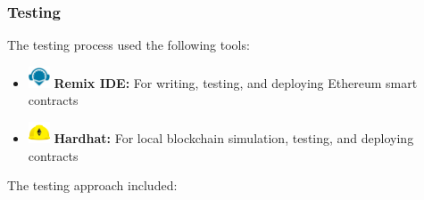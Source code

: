 \subsubsection{Testing}

The testing process used the following tools:

\begin{itemize}
    \item \includegraphics[width=0.05\textwidth]{images/icons/remix.png} \textbf{Remix IDE:} For writing, testing, and deploying Ethereum smart contracts
    \item \includegraphics[width=0.05\textwidth]{images/icons/hardhat.png} \textbf{Hardhat:} For local blockchain simulation, testing, and deploying contracts
\end{itemize}

The testing approach included:

